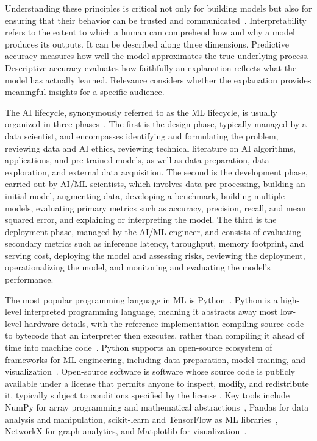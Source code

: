 \documentclass[
english,                 %
bibtex,                  %
]{kththesis}
\numberwithin{listing}{chapter}
\begin{document}
Understanding these principles is critical not only for building models but also for ensuring that their behavior can be trusted and communicated~\cite{murdoch_definitions_2019}. Interpretability refers to the extent to which a human can comprehend how and why a model produces its outputs. It can be described along three dimensions. Predictive accuracy measures how well the model approximates the true underlying process. Descriptive accuracy evaluates how faithfully an explanation reflects what the model has actually learned. Relevance considers whether the explanation provides meaningful insights for a specific audience.

The \gls{AI} lifecycle, synonymously referred to as the \gls{ML} lifecycle, is usually organized in three phases~\cite{de_silva_artificial_2022}. The first is the design phase, typically managed by a data scientist, and encompasses identifying and formulating the problem, reviewing data and \gls{AI} ethics, reviewing technical literature on \gls{AI} algorithms, applications, and pre-trained models, as well as data preparation, data exploration, and external data acquisition. The second is the development phase, carried out by \gls{AI}/\gls{ML} scientists, which involves data pre-processing, building an initial model, augmenting data, developing a benchmark, building multiple models, evaluating primary metrics such as accuracy, precision, recall, and mean squared error, and explaining or interpreting the model. The third is the deployment phase, managed by the \gls{AI}/\gls{ML} engineer, and consists of evaluating secondary metrics such as inference latency, throughput, memory footprint, and serving cost, deploying the model and assessing risks, reviewing the deployment, operationalizing the model, and monitoring and evaluating the model's performance.

The most popular programming language in \gls{ML} is Python~\cite{raschka_machine_2020}. Python is a high-level interpreted programming language, meaning it abstracts away most low-level hardware details, with the reference implementation compiling source code to bytecode that an interpreter then executes, rather than compiling it ahead of time into machine code~\cite{van_rossum_python_2003}. Python supports an open-source ecosystem of frameworks for \gls{ML} engineering, including data preparation, model training, and visualization~\cite{raschka_machine_2020}. Open-source software is software whose source code is publicly available under a license that permits anyone to inspect, modify, and redistribute it, typically subject to conditions specified by the license \cite{raymond_cathedral_2001}. Key tools include \gls{NumPy} for array programming and mathematical abstractions~\cite{harris_array_2020}, Pandas for data analysis and manipulation, \gls{scikit}-learn and TensorFlow as \gls{ML} libraries~\cite{abadi_tensorflow_2016}, NetworkX for graph analytics, and Matplotlib for visualization~\cite{barrett_matplotlib_2005}.
\end{document}
